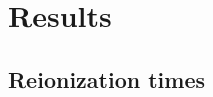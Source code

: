 \documentclass[twocolumn]{aastex61}
\begin{document}
\section{Results}

%
%
%
%



\subsection{Reionization times}
\end{document}
